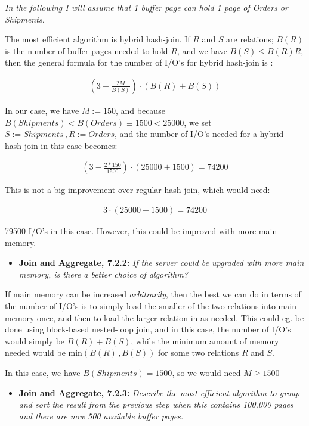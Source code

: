 \emph{In the following I will assume that 1 buffer page can hold 1 page of Orders or
Shipments.}

The most efficient algorithm is hybrid hash-join. If $R$ and $S$ are relations;
$B(R)$ is the number of buffer pages needed to hold $R$, and we have $B(S) \leq
B(R)R$, then the general formula for the number of I/O's for hybrid hash-join is :

\begin{align*}
  \left(3 - \frac{2M}{B(S)}\right)\cdot (B(R) + B(S))
\end{align*}


In our case, we have $M := 150$, and because $B(Shipments) < B(Orders) \equiv 1500 <
25000$, we set $S := Shipments\, , R := Orders$, and the number of I/O's needed
for a hybrid hash-join in this case becomes:

\begin{align*}
  \left(3 - \frac{2 * 150}{1500}\right) \cdot (25000 + 1500) = 74200
\end{align*}

This is not a big improvement over regular hash-join, which would need: 

\begin{align*}
  3 \cdot (25000 + 1500) = 74200
\end{align*}

79500 I/O's in this case. However, this could be improved with more main memory.


\begin{itemize}
  \item \textbf{Join and Aggregate, 7.2.2:}
        \textit{If the server could be upgraded with more main memory, is there
        a better choice of algorithm?}
\end{itemize}

If main memory can be increased \emph{arbitrarily}, then the best we can do in
terms of the number of I/O's is to simply load the smaller of the two relations
into main memory once, and then to load the larger relation in as needed. This
could eg. be done using block-based nested-loop join, and in this case, the
number of I/O's would simply be $B(R) + B(S)$, while the minimum amount of
memory needed would be $\text{min}(B(R)\, , B(S))$ for some two relations $R$ and
$S$.
\medskip

In this case, we have $B(Shipments) = 1500$, so we would need $M \geq 1500$


\begin{itemize}
  \item \textbf{Join and Aggregate, 7.2.3:}
        \textit{Describe the most efficient algorithm to group and sort the
        result from the previous step when this contains 100,000 pages and there
      are now 500 available buffer pages.}
\end{itemize}

